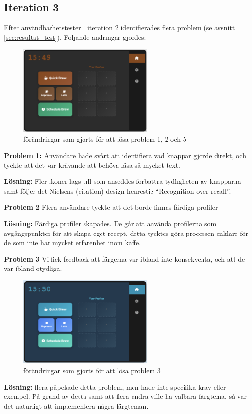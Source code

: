 
\subsection{Iteration 3}

Efter användbarhetstester i iteration 2 identifierades flera problem (se avsnitt \ref{sec:resultat_test}). Följande ändringar gjordes:


\begin{figure}[H]
    \centering
    \includegraphics[width=0.6\textwidth]{bilder/3problem1-25.png}
    \caption{ förändringar som gjorts för att lösa problem 1, 2 och 5}
    \label{fig:forbattring1}
\end{figure}

\textbf{Problem 1:} Användare hade svårt att identifiera vad knappar gjorde direkt, och tyckte att det var krävande att behöva läsa så mycket text.  

\textbf{Lösning:} Fler ikoner lags till som anseddes förbättra tydligheten av knapparna samt följer det Nielsens (citation) design heurestic “Recognition over recall”. 

\textbf{Problem 2} Flera användare tyckte att det borde finnas färdiga profiler 

 \textbf{Lösning:} Färdiga profiler skapades. De går att använda profilerna som avgångspunkter för att skapa eget recept, detta tycktes göra processen enklare för de som inte har mycket erfarenhet inom kaffe.  

 \textbf{Problem 3} Vi fick feedback att färgerna var ibland inte konsekventa, och att de var ibland otydliga.  

\begin{figure}[H]
    \centering
    \includegraphics[width=0.6\textwidth]{bilder/3problem2.png}
    \caption{ förändringar som gjorts för att lösa problem 3}
    \label{fig:2forbattring2}
\end{figure}
\textbf{Lösning:}  flera påpekade detta problem, men hade inte specifika krav eller exempel. På grund av detta samt att flera andra ville ha valbara färgtema, så var det naturligt att implementera några färgteman.   

